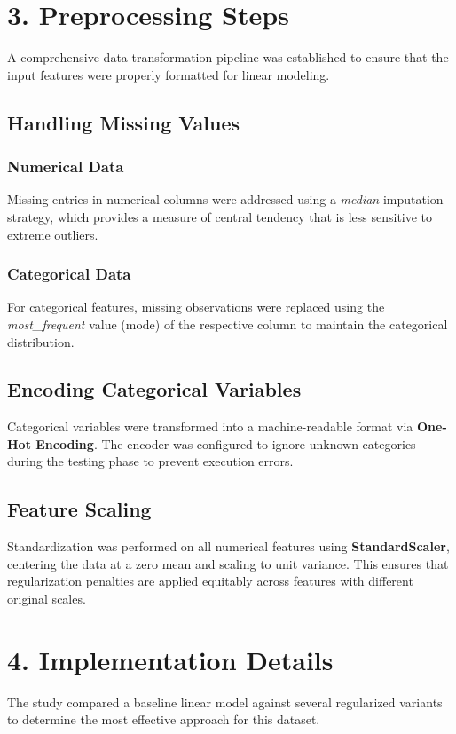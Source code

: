 \documentclass[11pt]{article}
\begin{document}
\section*{3. Preprocessing Steps}
A comprehensive data transformation pipeline was established to ensure that the input features were properly formatted for linear modeling.

\subsection*{Handling Missing Values}
\subsubsection*{Numerical Data}
Missing entries in numerical columns were addressed using a \textit{median} imputation strategy, which provides a measure of central tendency that is less sensitive to extreme outliers.

\subsubsection*{Categorical Data}
For categorical features, missing observations were replaced using the \textit{most\_frequent} value (mode) of the respective column to maintain the categorical distribution.

\subsection*{Encoding Categorical Variables}
Categorical variables were transformed into a machine-readable format via \textbf{One-Hot Encoding}. The encoder was configured to ignore unknown categories during the testing phase to prevent execution errors.

\subsection*{Feature Scaling}
Standardization was performed on all numerical features using \textbf{StandardScaler}, centering the data at a zero mean and scaling to unit variance. This ensures that regularization penalties are applied equitably across features with different original scales.

\section*{4. Implementation Details}
The study compared a baseline linear model against several regularized variants to determine the most effective approach for this dataset.
\end{document}
